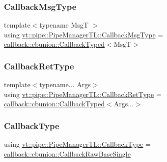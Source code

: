 \subsubsection{\texorpdfstring{Callback\+Msg\+Type}{CallbackMsgType}}
{\footnotesize\ttfamily template$<$typename MsgT $>$ \\
using \hyperlink{structvt_1_1pipe_1_1_pipe_manager_t_l_af6fc2c17f1729fa06450441b0ee81cb1}{vt\+::pipe\+::\+Pipe\+Manager\+T\+L\+::\+Callback\+Msg\+Type} =  \hyperlink{structvt_1_1pipe_1_1callback_1_1cbunion_1_1_callback_typed}{callback\+::cbunion\+::\+Callback\+Typed}$<$MsgT$>$}

\mbox{\label{structvt_1_1pipe_1_1_pipe_manager_t_l_a456fdd18da932171fe8abab8bb213aa9}} 
\subsubsection{\texorpdfstring{Callback\+Ret\+Type}{CallbackRetType}}
{\footnotesize\ttfamily template$<$typename... Args$>$ \\
using \hyperlink{structvt_1_1pipe_1_1_pipe_manager_t_l_a456fdd18da932171fe8abab8bb213aa9}{vt\+::pipe\+::\+Pipe\+Manager\+T\+L\+::\+Callback\+Ret\+Type} =  \hyperlink{structvt_1_1pipe_1_1callback_1_1cbunion_1_1_callback_typed}{callback\+::cbunion\+::\+Callback\+Typed}$<$Args...$>$}

\mbox{\label{structvt_1_1pipe_1_1_pipe_manager_t_l_a1cc1d0f1c80a36488f9b5d282e9755d2}} 
\subsubsection{\texorpdfstring{Callback\+Type}{CallbackType}}
{\footnotesize\ttfamily using \hyperlink{structvt_1_1pipe_1_1_pipe_manager_t_l_a1cc1d0f1c80a36488f9b5d282e9755d2}{vt\+::pipe\+::\+Pipe\+Manager\+T\+L\+::\+Callback\+Type} =  \hyperlink{structvt_1_1pipe_1_1callback_1_1cbunion_1_1_callback_raw_base_single}{callback\+::cbunion\+::\+Callback\+Raw\+Base\+Single}}


